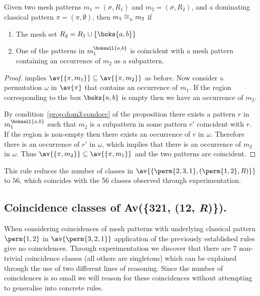 \begin{proposition}
    \label{prop:dom3}
    Given two mesh patterns \(m_1 =(\sigma, R_1)\) and \(m_2 = (\sigma, R_2)\),
    and a dominating classical pattern \(\pi = (\pi,\emptyset)\), then
    \(m_1 \cong_{\pi}^\text{} m_2\) if
    \begin{enumerate}
        \item The mesh set \(R_2 = R_1 \cup \{\boks{a,b}\}\)
        \item\label{prop:dom3:condocc} One of the patterns in \(m_1^\boksall{a,b}\)
            is coincident with a mesh pattern containing an occurrence of
            \(m_2\) as a subpattern.
    \end{enumerate}
\end{proposition}
\begin{proof}
     implies \(\av{\{\pi,m_1\}} \subseteq \av{\{\pi,m_2\}}\) as before.
    Now consider a permutation \(\omega\) in \(\av{\pi}\) that contains an
    occurrence of \(m_1\). If the region corresponding to the box \(\boks{a,b}\)
    is empty then we have an occurrence of \(m_2\).

    By condition~\ref{prop:dom3:condocc} of the proposition there exists
    a pattern \(r\) in \(m_1^\boksall{a,b}\) such that \(m_2\) is a subpattern in some
    pattern \(r'\) coincident with \(r\). If the region is non-empty then there exists
    an occurrence of \(r\) in \(\omega\). Therefore there is an occurrence of \(r'\)
    in \(\omega\), which implies that there is an occurrence of \(m_2\) in \(\omega\).
    Thus \(\av{\{\pi,m_2\}} \subseteq \av{\{\pi,m_1\}}\) and the
    two patterns are coincident.
\end{proof}

This rule reduces the number of classes in
\(\av{\{\perm{2,3,1},(\perm{1,2}, R)\}}\) to \(56\), which coincides with the
56 classes observed through experimentation.

\subsection{Coincidence classes of Av(\{321, (12, \textit{R})\}).}
When considering coincidences of mesh patterns with underlying classical
pattern \(\perm{1,2}\) in \(\av{\perm{3,2,1}}\) application of the previously
established rules give no coincidences. Through experimentation we discover
that there are \(7\) non-trivial coincidence classes (all others are singletons)
which can be explained through the
use of two different lines of reasoning. Since the number of coincidences is
so small we will reason for these coincidences without attempting to generalise
into concrete rules.

